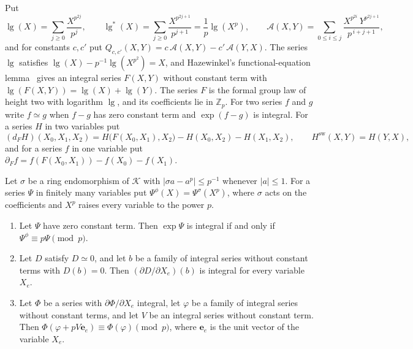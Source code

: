 Put
\[
\operatorname{lg}(X)=\sum_{j\ge0}\frac{X^{p^{2j}}}{p^j},\qquad\operatorname{lg}^\ast(X)=\sum_{j\ge0}\frac{X^{p^{2j+1}}}{p^{j+1}}=\frac1p\operatorname{lg}(X^p),\qquad\mathcal A(X,Y)=\sum_{0\le i\le j}\frac{X^{p^{2i}}\,Y^{p^{2j+1}}}{p^{\,i+j+1}},
\]
and for constants $c,c'$ put $Q_{c,c'}(X,Y)=c\,\mathcal A(X,Y)-c'\,\mathcal A(Y,X)$. The series $\operatorname{lg}$ satisfies $\operatorname{lg}(X)-p^{-1}\operatorname{lg}(X^{p^2})=X$, and Hazewinkel's functional-equation lemma~\cite[Section~2.2]{hazewinkel} gives an integral series $F(X,Y)$ without constant term with $\operatorname{lg}(F(X,Y))=\operatorname{lg}(X)+\operatorname{lg}(Y)$. The series $F$ is the formal group law of height two with logarithm $\operatorname{lg}$, and its coefficients lie in $\mathbb Z_p$. For two series $f$ and $g$ write $f\simeq g$ when $f-g$ has zero constant term and $\exp(f-g)$ is integral. For a series $H$ in two variables put
\[
(d_FH)(X_0,X_1,X_2)=H\big(F(X_0,X_1),X_2\big)-H(X_0,X_2)-H(X_1,X_2),\qquad H^{\mathrm{sw}}(X,Y)=H(Y,X),
\]
and for a series $f$ in one variable put $\partial_Ff=f(F(X_0,X_1))-f(X_0)-f(X_1)$.

\begin{lemma}\label{dwork}
Let $\sigma$ be a ring endomorphism of $\mathcal K$ with $\lvert\sigma a-a^p\rvert\le p^{-1}$ whenever $\lvert a\rvert\le1$. For a series $\Psi$ in finitely many variables put $\Psi^\phi(X)=\Psi^\sigma(X^p)$, where $\sigma$ acts on the coefficients and $X^p$ raises every variable to the power $p$.
\begin{enumerate}
\item[(i)] Let $\Psi$ have zero constant term. Then $\exp\Psi$ is integral if and only if $\Psi^\phi\equiv p\Psi\pmod p$.
\item[(ii)] Let $D$ satisfy $D\simeq0$, and let $b$ be a family of integral series without constant terms with $D(b)=0$. Then $(\partial D/\partial X_e)(b)$ is integral for every variable $X_e$.
\item[(iii)] Let $\Phi$ be a series with $\partial\Phi/\partial X_e$ integral, let $\varphi$ be a family of integral series without constant terms, and let $V$ be an integral series without constant term. Then $\Phi(\varphi+pV\mathbf e_e)\equiv\Phi(\varphi)\pmod p$, where $\mathbf e_e$ is the unit vector of the variable $X_e$.
\end{enumerate}
\end{lemma}

